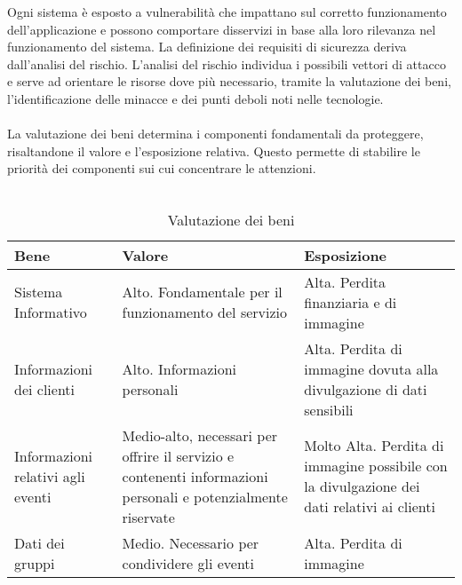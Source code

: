 Ogni sistema è esposto a vulnerabilità che impattano sul corretto funzionamento dell'applicazione
e possono comportare disservizi in base alla loro rilevanza nel funzionamento del sistema.
La definizione dei requisiti di sicurezza deriva dall'analisi del rischio.
L'analisi del rischio individua i possibili vettori di attacco e serve ad orientare le risorse dove più necessario,
tramite la valutazione dei beni, l'identificazione delle minacce e dei punti deboli noti nelle tecnologie.\\
\\
La valutazione dei beni determina i componenti fondamentali da proteggere,
risaltandone il valore e l'esposizione relativa.
Questo permette di stabilire le priorità dei componenti sui cui concentrare le attenzioni.\\
\\
\begin{table}[htb]
    \begin{tabular} {|P{3.5cm}|P{5.5cm}|P{6.7cm}|}
        \hline
        \textbf{Bene}                     & \textbf{Valore}                                                                                              & \textbf{Esposizione}      \\
        \hline
        Sistema Informativo               & Alto. Fondamentale per il funzionamento del servizio                                                         &
        Alta. Perdita finanziaria e di immagine                                                                                                                                      \\
        \hline
        Informazioni dei clienti          & Alto. Informazioni personali                                                                                 &
        Alta. Perdita di immagine dovuta alla divulgazione
        di dati sensibili                                                                                                                                                            \\
        \hline
        Informazioni relativi agli eventi & Medio-alto, necessari per offrire il servizio e contenenti informazioni personali e potenzialmente riservate &
        Molto Alta. Perdita di immagine possibile con la divulgazione dei dati relativi ai
        clienti                                                                                                                                                                      \\
        \hline
        Dati dei gruppi                   & Medio. Necessario per condividere gli eventi                                                                 & Alta. Perdita di immagine \\
        \hline
    \end{tabular}
    \caption{Valutazione dei beni}
\end{table}

